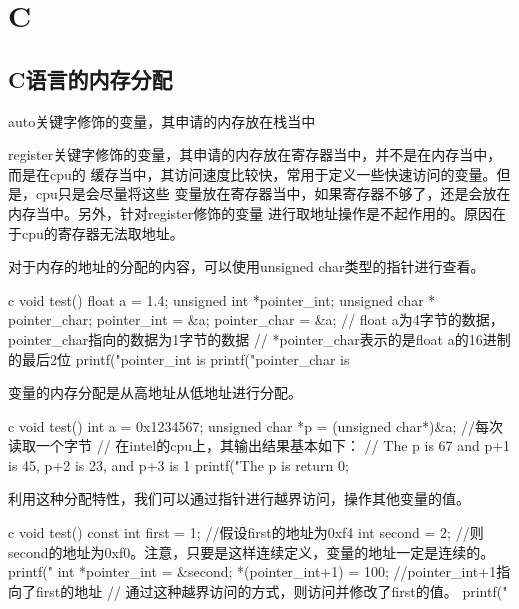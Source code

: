 \chapter{C}

\section{C语言的内存分配}
auto关键字修饰的变量，其申请的内存放在栈当中

register关键字修饰的变量，其申请的内存放在寄存器当中，并不是在内存当中，而是在cpu的
缓存当中，其访问速度比较快，常用于定义一些快速访问的变量。但是，cpu只是会尽量将这些
变量放在寄存器当中，如果寄存器不够了，还是会放在内存当中。另外，针对register修饰的变量
进行取地址操作是不起作用的。原因在于cpu的寄存器无法取地址。

对于内存的地址的分配的内容，可以使用unsigned char类型的指针进行查看。
\begin{code-block}{c}
void test()
{
    float a = 1.4;
    unsigned int *pointer_int;
    unsigned char * pointer_char;
    pointer_int = &a;
    pointer_char = &a; // float a为4字节的数据，pointer_char指向的数据为1字节的数据
                       // *pointer_char表示的是float a的16进制的最后2位
    printf("pointer_int is %
    printf("pointer_char is %
}
\end{code-block}

变量的内存分配是从高地址从低地址进行分配。
\begin{code-block}{c}
void test()
{
    int a = 0x1234567;
    unsigned char *p = (unsigned char*)&a; //每次读取一个字节
    // 在intel的cpu上，其输出结果基本如下：
    // The p is 67 and p+1 is 45, p+2 is 23, and p+3 is 1
    printf("The p is %
    return 0;
}
\end{code-block}

利用这种分配特性，我们可以通过指针进行越界访问，操作其他变量的值。
\begin{code-block}{c}
void test()
{
    const int first = 1; //假设first的地址为0xf4
    int second = 2;      //则second的地址为0xf0。注意，只要是这样连续定义，变量的地址一定是连续的。
    printf("%
    int *pointer_int = &second;
    *(pointer_int+1) = 100; //pointer_int+1指向了first的地址
                            // 通过这种越界访问的方式，则访问并修改了first的值。
    printf("%
}
\end{code-block}

